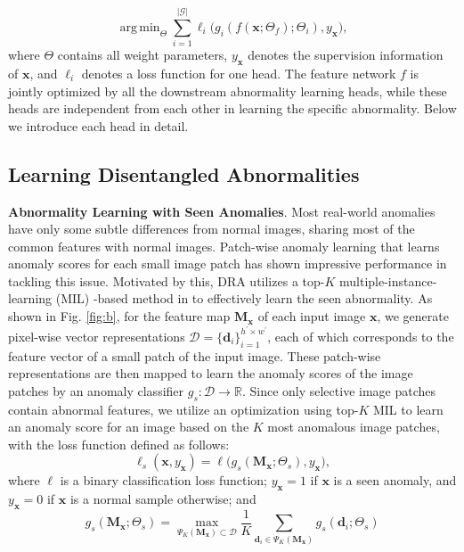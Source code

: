 \documentclass[10pt,twocolumn,letterpaper]{article}
\DeclareMathOperator*{\argmin}{arg\,min}
\newcommand{\xvec}{{\mathbf{x}}}
\newcommand{\yxvec}{{y_{\mathbf{x}}}}
\begin{document}
\begin{equation}
\argmin_{\Theta}\sum_{i=1}^{|\mathcal{G}|} \ell_i\big(g_i(f (\mathbf{x};\Theta_f);\Theta_{i}), y_{\xvec}\big),
\end{equation}
where $\Theta$ contains all weight parameters, $y_{\xvec}$ denotes the supervision information of $\xvec$, and $\ell_i$ denotes a loss function for one head. The feature network $f$ is jointly optimized by all the downstream abnormality learning heads, while these heads are independent from each other in learning the specific abnormality. 
Below we introduce each head in detail.
\subsection{Learning Disentangled Abnormalities}

\textbf{Abnormality Learning with Seen Anomalies}.
Most real-world anomalies have only some subtle differences from normal images, sharing most of the common features with normal images.
Patch-wise anomaly learning \cite{yi2020patch, Bergmann_2020_CVPR, wang2021glancing,pang2021explainable} that learns anomaly scores for each small image patch has shown impressive performance in tackling this issue.
Motivated by this, DRA utilizes a top-$K$ multiple-instance-learning (MIL) -based method in \cite{pang2021explainable} to effectively learn the seen abnormality. 
As shown in Fig. \ref{fig:b}, for the feature map $\mathbf{M}_{\xvec}$ of each input image $\xvec$, we generate pixel-wise vector representations $\mathcal{D}=\{\mathbf{d}_i\}_{i=1}^{h^\prime\times w^\prime}$, each of which corresponds to 
the feature vector of a small patch of the input image. These patch-wise representations are then mapped to learn the anomaly scores of the image patches by an anomaly classifier $g_s: \mathcal{D} \rightarrow \mathbb{R}$.
Since only selective image patches contain abnormal features, 
we utilize an optimization using top-$K$ MIL to learn an anomaly score for an image based on the $K$ most anomalous image patches, with the loss function defined as follows:
\begin{equation}\label{eqn:mil}
    \ell_{s}(\mathbf{x}, \yxvec) = \ell\big(g_s(\mathbf{M}_{\xvec}; \Theta_{s}), \yxvec\big),
\end{equation}
where $\ell$ is a binary classification loss function; $\yxvec = 1$ if $\xvec$ is a seen anomaly, and $\yxvec = 0$ if $\xvec$ is a normal sample otherwise; and 
\begin{equation}\label{eqn:seenabnormality}
g_s(\mathbf{M}_{\xvec}; \Theta_{s}) = \max_{\Psi_K(\mathbf{M}_{\xvec})\subset \mathcal{D}} \frac{1}{K} \sum_{\mathbf{d}_{i} \in \Psi_K(\mathbf{M}_{\xvec})} g_s(\mathbf{d}_{i}; \Theta_{s})
\end{equation}
\end{document}
